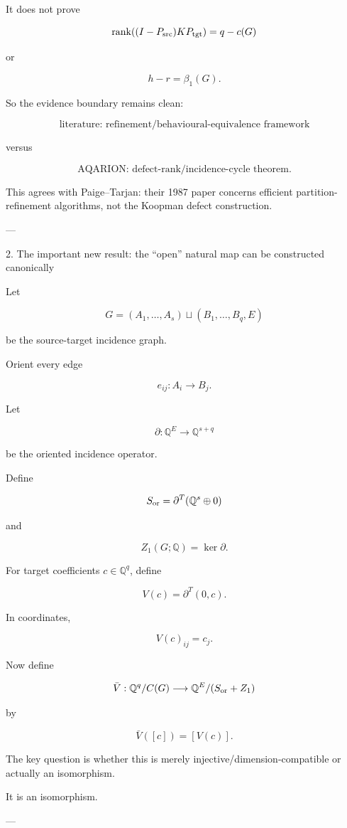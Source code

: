 It does not prove

\[
\operatorname{rank}((I-P_{\rm src})KP_{\rm tgt})=q-c(G)
\]

or

\[
h-r=\beta_1(G).
\]

So the evidence boundary remains clean:

\[
\boxed{\text{literature: refinement/behavioural-equivalence framework}}
\]

versus

\[
\boxed{\text{AQARION: defect-rank/incidence-cycle theorem}.}
\]

This agrees with Paige–Tarjan: their 1987 paper concerns efficient partition-refinement algorithms, not the Koopman defect construction. 


---

2. The important new result: the “open” natural map can be constructed canonically

Let

\[
G=(A_1,\dots,A_s)\sqcup(B_1,\dots,B_q,E)
\]

be the source-target incidence graph.

Orient every edge

\[
e_{ij}:A_i\longrightarrow B_j.
\]

Let

\[
\partial:\mathbb Q^E\to\mathbb Q^{s+q}
\]

be the oriented incidence operator.

Define

\[
S_{\rm or}
=
\partial^{T}(\mathbb Q^s\oplus0)
\]

and

\[
Z_1(G;\mathbb Q)=\ker\partial.
\]

For target coefficients \(c\in\mathbb Q^q\), define

\[
V(c)=\partial^T(0,c).
\]

In coordinates,

\[
V(c)_{ij}=c_j.
\]

Now define

\[
\bar V:
\mathbb Q^q/C(G)
\longrightarrow
\mathbb Q^E/(S_{\rm or}+Z_1)
\]

by

\[
\boxed{
\bar V([c])
=
[V(c)].
}
\]

The key question is whether this is merely injective/dimension-compatible or actually an isomorphism.

It is an isomorphism.


---

